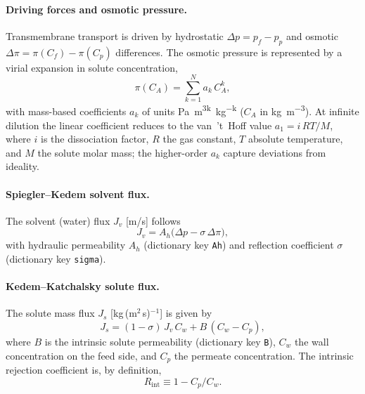 \documentclass[11pt,a4paper]{article}
\begin{document}
\paragraph{Driving forces and osmotic pressure.}
Transmembrane transport is driven by hydrostatic
\(\Delta p = p_f - p_p\) and osmotic
\(\Delta\pi = \pi(C_f) - \pi(C_p)\) differences. The osmotic pressure
is represented by a virial expansion in solute concentration,
\begin{equation}
	\pi(C_A) = \sum_{k=1}^{N} a_k\,C_A^k ,
	\label{eq:osmotic-virial}
\end{equation}
with mass-based coefficients \(a_k\) of units
\si{Pa.m^{3k}.kg^{-k}} (\(C_A\) in \si{kg.m^{-3}}). At infinite
dilution the linear coefficient reduces to the van~'t~Hoff value
\(a_1 = i\,RT/M\), where \(i\) is the dissociation factor, \(R\) the
gas constant, \(T\) absolute temperature, and \(M\) the solute molar
mass; the higher-order \(a_k\) capture deviations from ideality.

\paragraph{Spiegler--Kedem solvent flux.}
The solvent (water) flux \(J_v\) [m/s] follows
\begin{equation}
	J_v = A_h\bigl(\Delta p - \sigma\,\Delta\pi\bigr),
	\label{eq:jv-s-k}
\end{equation}
with hydraulic permeability \(A_h\) (dictionary key \texttt{Ah}) and
reflection coefficient \(\sigma\) (dictionary key \texttt{sigma}).

\paragraph{Kedem--Katchalsky solute flux.}
The solute mass flux \(J_s\) [kg\,(m\(^2\)\,s)\(^{-1}\)] is given by
\begin{equation}
	J_s = (1 - \sigma)\,J_v\,C_w + B\,(C_w - C_p),
	\label{eq:js-s-k}
\end{equation}
where \(B\) is the intrinsic solute permeability (dictionary key
\texttt{B}), \(C_w\) the wall concentration on the feed side, and
\(C_p\) the permeate concentration. The intrinsic rejection
coefficient is, by definition,
\begin{equation}
	R_\mathrm{int} \equiv 1 - C_p/C_w .
	\label{eq:Rint-def}
\end{equation}
\end{document}
